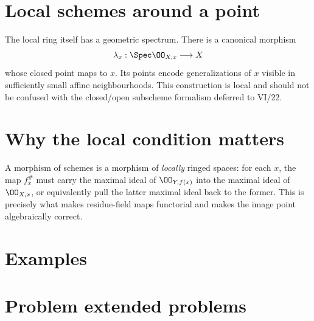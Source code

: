 \section{Local schemes around a point}
The local ring itself has a geometric spectrum.  There is a canonical morphism
\[
 \lambda_x:\Spec\OO_{X,x}\longrightarrow X
\]
whose closed point maps to $x$.  Its points encode generalizations of $x$ visible in sufficiently
small affine neighbourhoods.  This construction is local and should not be confused with the
closed/open subscheme formalism deferred to VI/22.



\section{Why the local condition matters}
A morphism of schemes is a morphism of \emph{locally} ringed spaces: for each $x$, the map
$f_x^\#$ must carry the maximal ideal of $\OO_{Y,f(x)}$ into the maximal ideal of $\OO_{X,x}$,
or equivalently pull the latter maximal ideal back to the former.  This is precisely what makes
residue-field maps functorial and makes the image point algebraically correct.



\section{Examples}



\section{Problem extended problems}





















